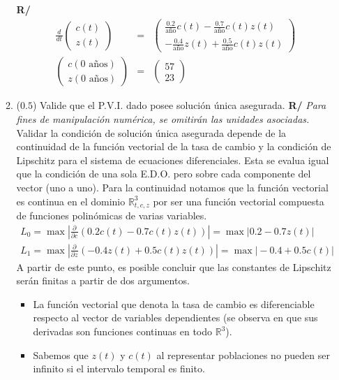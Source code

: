 \documentclass[12pt]{article}
\newcommand{\R}{\ensuremath{\mathbb{R}}}
\newcommand{\diff}[3]{\frac{d^{#3} #1}{d#2^{#3}}}
\newcommand{\pdiff}[3]{\frac{\partial^{#3} #1}{\partial#2^{#3}}}
\begin{document}
\begin{enumerate}[leftmargin=*,widest=9]
\begin{enumerate}[label=\alph*]
\textbf{R/}
    \begin{eqnarray*}
    \diff{}{t}{}\begin{pmatrix} c(t) \\ z(t)
    \end{pmatrix} &=& \begin{pmatrix} \frac{0.2}{\text{año}} c(t) - \frac{0.7}{\text{año}} c(t) z(t) \\ -\frac{0.4}{\text{año}} z(t) + \frac{0.5}{\text{año}} c(t) z(t)
    \end{pmatrix} \\
    \begin{pmatrix} c(0 \text{ años}) \\ z(0 \text{ años})
    \end{pmatrix} &=& \begin{pmatrix} 57 \\ 23 \end{pmatrix}
    \end{eqnarray*}
    \item (\(0.5\)) Valide que el P.V.I. dado posee solución única asegurada.
    \textbf{R/} \textit{Para fines de manipulación numérica, se omitirán las unidades asociadas.}
    Validar la condición de solución única asegurada depende de la continuidad de la función vectorial de la tasa de cambio y la condición de Lipschitz para el sistema de ecuaciones diferenciales. Esta se evalua igual que la condición de una sola E.D.O. pero sobre cada componente del vector (uno a uno). Para la continuidad notamos que la función vectorial es continua en el dominio \(\R^3_{t,c,z}\) por ser una función vectorial compuesta de funciones polinómicas de varias variables.
    \begin{eqnarray*}
    L_0 = \max \left\vert \pdiff{}{c}{} (0.2 c(t) - 0.7 c(t) z(t)) \right\vert = \max \vert 0.2 - 0.7 z(t)\vert \\
    L_1 = \max \left\vert \pdiff{}{z}{} (-0.4 z(t) + 0.5 c(t) z(t)) \right\vert = \max \vert -0.4 + 0.5 c(t) \vert
    \end{eqnarray*}
    A partir de este punto, es posible concluir que las constantes de Lipschitz serán finitas a partir de dos argumentos.
    \begin{itemize}
\item La función vectorial que denota la tasa de cambio es diferenciable respecto al vector de variables dependientes (se observa en que sus derivadas son funciones continuas en todo \(\R^3\)).
\item Sabemos que \(z(t)\) y \(c(t)\) al representar poblaciones no pueden ser infinito si el intervalo temporal es finito.

\end{itemize}
\end{enumerate}
\end{enumerate}
\end{document}
